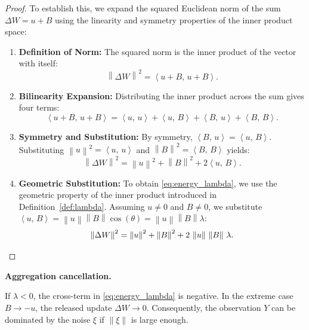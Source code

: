 \documentclass[bdcc,article,submit,pdftex]{Definitions/mdpi}
\newcommand{\ip}[2]{\left\langle #1,\,#2 \right\rangle}
\newcommand{\norm}[1]{\left\lVert #1 \right\rVert}
\newcommand{\utarget}{u}
\renewcommand{\paragraph}[1]{\medskip\noindent\textbf{#1}\par\nobreak}
\begin{document}
\begin{proof}
To establish this, we expand the squared Euclidean norm of the sum $\Delta W = \utarget + B$ using the linearity and symmetry properties of the inner product space:

\begin{enumerate}[leftmargin=*]
    \item \textbf{Definition of Norm:} The squared norm is the inner product of the vector with itself:
    \begin{equation*}
    \norm{\Delta W}^2 = \ip{\utarget + B}{\utarget + B}.
    \end{equation*}

    \item \textbf{Bilinearity Expansion:} Distributing the inner product across the sum gives four terms:
    \begin{equation*}
    \ip{\utarget + B}{\utarget + B} = \ip{\utarget}{\utarget} + \ip{\utarget}{B} + \ip{B}{\utarget} + \ip{B}{B}.
    \end{equation*}

    \item \textbf{Symmetry and Substitution:} By symmetry, $\ip{B}{\utarget} = \ip{\utarget}{B}$. Substituting $\norm{\utarget}^2 = \ip{\utarget}{\utarget}$ and $\norm{B}^2 = \ip{B}{B}$ yields:
    \begin{equation*}
    \norm{\Delta W}^2 = \norm{\utarget}^2 + \norm{B}^2 + 2\ip{\utarget}{B}.
    \end{equation*}

    \item \textbf{Geometric Substitution:} To obtain \eqref{eq:energy_lambda}, we use the geometric property of the inner product introduced in Definition~\ref{def:lambda}. Assuming $\utarget \neq 0$ and $B \neq 0$, we substitute $\ip{\utarget}{B} = \norm{\utarget}\norm{B}\cos(\theta) = \norm{\utarget}\norm{B}\lambda$:
    \begin{equation*}
    \norm{\Delta W}^2 = \norm{\utarget}^2 + \norm{B}^2 + 2\,\norm{\utarget}\,\norm{B}\,\lambda. \qedhere
    \end{equation*}
\end{enumerate}
\end{proof}

\paragraph{Aggregation cancellation.}
If $\lambda<0$, the cross-term in \eqref{eq:energy_lambda} is negative. In the extreme case $B \to -\utarget$, the released update $\Delta W \to 0$.
Consequently, the observation $Y$ can be dominated by the noise $\xi$ if $\norm{\xi}$ is large enough.
\end{document}
